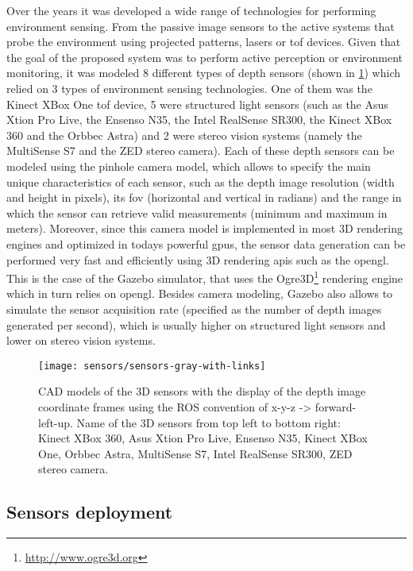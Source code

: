 Over the years it was developed a wide range of technologies for performing environment sensing. From the passive image sensors to the active systems that probe the environment using projected patterns, lasers or \gls{tof} devices. Given that the goal of the proposed system was to perform active perception or environment monitoring, it was modeled 8 different types of depth sensors (shown in \cref{fig:sensors}) which relied on 3 types of environment sensing technologies. One of them was the Kinect XBox One \gls{tof} device, 5 were structured light sensors (such as the Asus Xtion Pro Live, the Ensenso N35, the Intel RealSense SR300, the Kinect XBox 360 and the Orbbec Astra) and 2 were stereo vision systems (namely the MultiSense S7 and the ZED stereo camera). Each of these depth sensors can be modeled using the pinhole camera model, which allows to specify the main unique characteristics of each sensor, such as the depth image resolution (width and height in pixels), its \gls{fov} (horizontal and vertical in radians) and the range in which the sensor can retrieve valid measurements (minimum and maximum in meters). Moreover, since this camera model is implemented in most 3D rendering engines and optimized in todays powerful \glspl{gpu}, the sensor data generation can be performed very fast and efficiently using 3D rendering \glspl{api} such as the \gls{opengl}. This is the case of the Gazebo simulator, that uses the Ogre3D\footnote{\url{http://www.ogre3d.org}} rendering engine which in turn relies on \gls{opengl}. Besides camera modeling, Gazebo also allows to simulate the sensor acquisition rate (specified as the number of depth images generated per second), which is usually higher on structured light sensors and lower on stereo vision systems.

\begin{figure}
	\centering
	\texttt{[image: sensors/sensors-gray-with-links]}
	\caption{CAD models of the 3D sensors with the display of the depth image coordinate frames using the ROS convention of x-y-z -> forward-left-up. Name of the 3D sensors from top left to bottom right: Kinect XBox 360, Asus Xtion Pro Live, Ensenso N35, Kinect XBox One, Orbbec Astra, MultiSense S7, Intel RealSense SR300, ZED stereo camera.}
	\label{fig:sensors}
\end{figure}


\subsection{Sensors deployment}\label{subsec:sensors-deployment}

